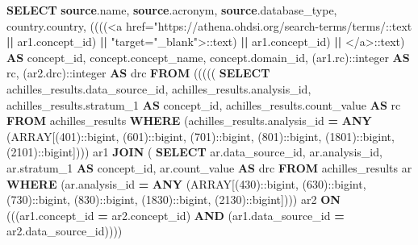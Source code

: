 \documentclass[
]{book}
\newenvironment{Shaded}{\begin{snugshade}}{\end{snugshade}}
\newcommand{\CharTok}[1]{\textcolor[rgb]{0.31,0.60,0.02}{#1}}
\newcommand{\DataTypeTok}[1]{\textcolor[rgb]{0.13,0.29,0.53}{#1}}
\newcommand{\DecValTok}[1]{\textcolor[rgb]{0.00,0.00,0.81}{#1}}
\newcommand{\KeywordTok}[1]{\textcolor[rgb]{0.13,0.29,0.53}{\textbf{#1}}}
\newcommand{\NormalTok}[1]{#1}
\newcommand{\OperatorTok}[1]{\textcolor[rgb]{0.81,0.36,0.00}{\textbf{#1}}}
\newcommand{\StringTok}[1]{\textcolor[rgb]{0.31,0.60,0.02}{#1}}
\begin{document}
\begin{Shaded}
\begin{Highlighting}[]
\KeywordTok{SELECT} \KeywordTok{source}\NormalTok{.name,}
   \KeywordTok{source}\NormalTok{.acronym,}
   \KeywordTok{source}\NormalTok{.database\_type,}
\NormalTok{   country.country,}
\NormalTok{   ((((}\StringTok{\textquotesingle{}\textless{}a href="https://athena.ohdsi.org/search{-}terms/terms/\textquotesingle{}}\NormalTok{:}\CharTok{:text} \OperatorTok{||}\NormalTok{ ar1.concept\_id) }\OperatorTok{||} \StringTok{\textquotesingle{}"target="\_blank"\textgreater{}\textquotesingle{}}\NormalTok{:}\CharTok{:text}\NormalTok{) }\OperatorTok{||}\NormalTok{ ar1.concept\_id) }\OperatorTok{||} \StringTok{\textquotesingle{}\textless{}/a\textgreater{}\textquotesingle{}}\NormalTok{:}\CharTok{:text}\NormalTok{) }\KeywordTok{AS}\NormalTok{ concept\_id,}
\NormalTok{   concept.concept\_name,}
\NormalTok{   concept.domain\_id,}
\NormalTok{   (ar1.rc):}\CharTok{:integer} \KeywordTok{AS}\NormalTok{ rc,}
\NormalTok{   (ar2.drc):}\CharTok{:integer} \KeywordTok{AS}\NormalTok{ drc}
  \KeywordTok{FROM}\NormalTok{ ((((( }\KeywordTok{SELECT}\NormalTok{ achilles\_results.data\_source\_id,}
\NormalTok{           achilles\_results.analysis\_id,}
\NormalTok{           achilles\_results.stratum\_1 }\KeywordTok{AS}\NormalTok{ concept\_id,}
\NormalTok{           achilles\_results.count\_value }\KeywordTok{AS}\NormalTok{ rc}
          \KeywordTok{FROM}\NormalTok{ achilles\_results}
         \KeywordTok{WHERE}\NormalTok{ (achilles\_results.analysis\_id }\OperatorTok{=} \KeywordTok{ANY}\NormalTok{ (}\DataTypeTok{ARRAY}\NormalTok{[(}\DecValTok{401}\NormalTok{):}\CharTok{:bigint}\NormalTok{, (}\DecValTok{601}\NormalTok{):}\CharTok{:bigint}\NormalTok{, (}\DecValTok{701}\NormalTok{):}\CharTok{:bigint}\NormalTok{, (}\DecValTok{801}\NormalTok{):}\CharTok{:bigint}\NormalTok{, (}\DecValTok{1801}\NormalTok{):}\CharTok{:bigint}\NormalTok{, (}\DecValTok{2101}\NormalTok{):}\CharTok{:bigint}\NormalTok{]))) ar1}
    \KeywordTok{JOIN}\NormalTok{ ( }\KeywordTok{SELECT}\NormalTok{ ar.data\_source\_id,}
\NormalTok{           ar.analysis\_id,}
\NormalTok{           ar.stratum\_1 }\KeywordTok{AS}\NormalTok{ concept\_id,}
\NormalTok{           ar.count\_value }\KeywordTok{AS}\NormalTok{ drc}
          \KeywordTok{FROM}\NormalTok{ achilles\_results ar}
         \KeywordTok{WHERE}\NormalTok{ (ar.analysis\_id }\OperatorTok{=} \KeywordTok{ANY}\NormalTok{ (}\DataTypeTok{ARRAY}\NormalTok{[(}\DecValTok{430}\NormalTok{):}\CharTok{:bigint}\NormalTok{, (}\DecValTok{630}\NormalTok{):}\CharTok{:bigint}\NormalTok{, (}\DecValTok{730}\NormalTok{):}\CharTok{:bigint}\NormalTok{, (}\DecValTok{830}\NormalTok{):}\CharTok{:bigint}\NormalTok{, (}\DecValTok{1830}\NormalTok{):}\CharTok{:bigint}\NormalTok{, (}\DecValTok{2130}\NormalTok{):}\CharTok{:bigint}\NormalTok{]))) ar2 }\KeywordTok{ON}\NormalTok{ (((ar1.concept\_id }\OperatorTok{=}\NormalTok{ ar2.concept\_id) }\KeywordTok{AND}\NormalTok{ (ar1.data\_source\_id }\OperatorTok{=}\NormalTok{ ar2.data\_source\_id))))}

\end{Highlighting}
\end{Shaded}
\end{document}
